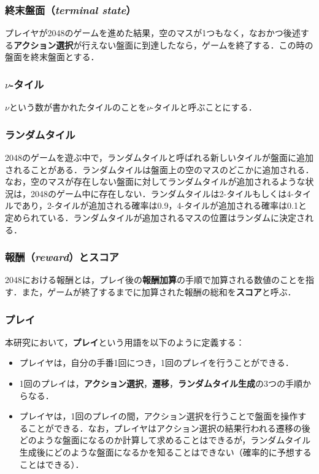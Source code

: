 \documentclass{suribt}
\begin{document}
\subsubsection{終末盤面（\textit{terminal state}）}
プレイヤが2048のゲームを進めた結果，空のマスが1つもなく，なおかつ後述する\textbf{アクション選択}が行えない盤面に到達したなら，ゲームを終了する．この時の盤面を終末盤面とする．

\subsubsection{${\nu}$-タイル}
${\nu}$という数が書かれたタイルのことを${\nu}$-タイルと呼ぶことにする．

\subsubsection{ランダムタイル}
2048のゲームを遊ぶ中で，ランダムタイルと呼ばれる新しいタイルが盤面に追加されることがある．ランダムタイルは盤面上の空のマスのどこかに追加される．なお，空のマスが存在しない盤面に対してランダムタイルが追加されるような状況は，2048のゲーム中に存在しない．ランダムタイルは2-タイルもしくは4-タイルであり，2-タイルが追加される確率は0.9，4-タイルが追加される確率は0.1と定められている．ランダムタイルが追加されるマスの位置はランダムに決定される．

\subsubsection{報酬（\textit{reward}）とスコア}
2048における報酬とは，プレイ後の\textbf{報酬加算}の手順で加算される数値のことを指す．また，ゲームが終了するまでに加算された報酬の総和を\textbf{スコア}と呼ぶ．

\subsubsection{プレイ}
本研究において，\textbf{プレイ}という用語を以下のように定義する：
\begin{itemize}
\item プレイヤは，自分の手番1回につき，1回のプレイを行うことができる．
\item 1回のプレイは，\textbf{アクション選択}，\textbf{遷移}，\textbf{ランダムタイル生成}の3つの手順からなる．
\item プレイヤは，1回のプレイの間，アクション選択を行うことで盤面を操作することができる．なお，プレイヤはアクション選択の結果行われる遷移の後どのような盤面になるのか計算して求めることはできるが，ランダムタイル生成後にどのような盤面になるかを知ることはできない（確率的に予想することはできる）．
\end{itemize}
\end{document}
